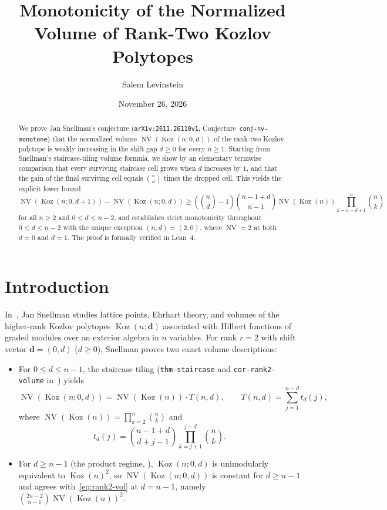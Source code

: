 \documentclass[11pt]{article}
\title{Monotonicity of the Normalized Volume of Rank-Two Kozlov Polytopes}
\author{Salem Levinstein}
\date{November 26, 2026}
\theoremstyle{remark}
\DeclareMathOperator{\NV}{NV}
\DeclareMathOperator{\Koz}{Koz}
\begin{document}
\maketitle

\begin{abstract}
We prove Jan Snellman's conjecture (\texttt{arXiv:2611.26110v1}, Conjecture~\texttt{conj-nv-monotone}) that the normalized volume $\NV(\Koz(n; 0, d))$ of the rank-two Kozlov polytope is weakly increasing in the shift gap $d \ge 0$ for every $n \ge 1$. Starting from Snellman's staircase-tiling volume formula, we show by an elementary termwise comparison that every surviving staircase cell grows when $d$ increases by $1$, and that the gain of the final surviving cell equals $\binom{n}{d}$ times the dropped cell. This yields the explicit lower bound
\[
  \NV(\Koz(n; 0, d + 1)) - \NV(\Koz(n; 0, d)) \ge \left(\binom{n}{d} - 1\right)\binom{n-1+d}{n-1} \NV(\Koz(n)) \prod_{k=n-d+1}^{n} \binom{n}{k}
\]
for all $n \ge 2$ and $0 \le d \le n - 2$, and establishes strict monotonicity throughout $0 \le d \le n - 2$ with the unique exception $(n, d) = (2, 0)$, where $\NV = 2$ at both $d = 0$ and $d = 1$. The proof is formally verified in Lean~4.
\end{abstract}

\section{Introduction}

In~\cite{Snellman2026}, Jan Snellman studies lattice points, Ehrhart theory, and volumes of the higher-rank Kozlov polytopes $\Koz(n; \mathbf{d})$ associated with Hilbert functions of graded modules over an exterior algebra in $n$ variables. For rank $r = 2$ with shift vector $\mathbf{d} = (0, d)$ ($d \ge 0$), Snellman proves two exact volume descriptions:
\begin{itemize}
  \item For $0 \le d \le n - 1$, the staircase tiling (\texttt{thm-staircase} and \texttt{cor-\allowbreak rank2-\allowbreak volume} in~\cite{Snellman2026}) yields
  \begin{equation}\label{eq:rank2-vol}
    \NV(\Koz(n; 0, d)) = \NV(\Koz(n)) \cdot T(n, d), \qquad T(n, d) = \sum_{j=1}^{n-d} t_d(j),
  \end{equation}
  where $\NV(\Koz(n)) = \prod_{k=2}^{n} \binom{n}{k}$ and
  \[
    t_d(j) = \binom{n - 1 + d}{d + j - 1} \prod_{k=j+1}^{j+d} \binom{n}{k}.
  \]
  \item For $d \ge n - 1$ (the product regime, \cite[Proposition~\texttt{prop-product-regime}]{Snellman2026}), $\Koz(n; 0, d)$ is unimodularly equivalent to $\Koz(n)^2$, so $\NV(\Koz(n; 0, d))$ is constant for $d \ge n - 1$ and agrees with~\eqref{eq:rank2-vol} at $d = n - 1$, namely $\binom{2n-2}{n-1}\NV(\Koz(n))^2$.
\end{itemize}
\end{document}
